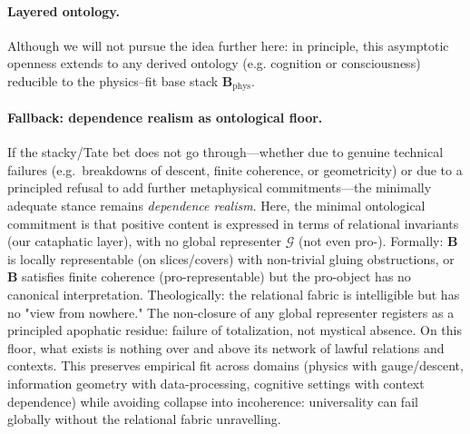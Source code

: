 \documentclass[11pt]{article}
\theoremstyle{upright}
\begin{document}
\paragraph{Layered ontology.}
Although we will not pursue the idea further here: in principle, this asymptotic openness extends to any derived ontology (e.g. cognition or consciousness) reducible to the physics–fit base stack $\mathbf B_{\mathrm{phys}}$. 

\paragraph{Fallback: dependence realism as ontological floor.}
If the stacky/Tate bet does not go through—whether due to genuine technical failures (e.g.\ breakdowns of descent, finite coherence, or geometricity) or due to a principled refusal to add further metaphysical commitments—the minimally adequate stance remains \emph{dependence realism}. Here, the minimal ontological commitment is that positive content is expressed in terms of relational invariants (our cataphatic layer), with no global representer \(\mathcal G\) (not even pro-). Formally: \(\mathbf B\) is locally representable (on slices/covers) with non-trivial gluing obstructions, or \(\mathbf B\) satisfies finite coherence (pro-representable) but the pro-object has no canonical interpretation. Theologically: the relational fabric is intelligible but has no "view from nowhere." The non-closure of any global representer registers as a principled apophatic residue: failure of totalization, not mystical absence. On this floor, what exists is nothing over and above its network of lawful relations and contexts. This preserves empirical fit across domains (physics with gauge/descent, information geometry with data-processing, cognitive settings with context dependence) while avoiding collapse into incoherence: universality can fail globally without the relational fabric unravelling.
\end{document}
